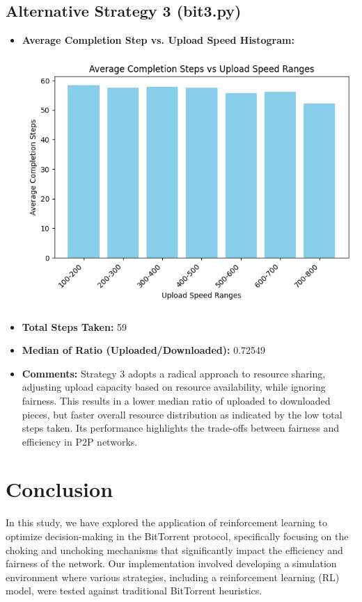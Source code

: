 \documentclass{article}
\begin{document}
\subsection{Alternative Strategy 3 (bit3.py)}
\begin{itemize}
\item \textbf{Average Completion Step vs. Upload Speed Histogram:} 

\includegraphics[width=\linewidth]{graphs/bit3.png}
\item \textbf{Total Steps Taken:} 59
\item \textbf{Median of Ratio (Uploaded/Downloaded):} 0.72549
\item \textbf{Comments:} Strategy 3 adopts a radical approach to resource sharing, adjusting upload capacity based on resource availability, while ignoring fairness. This results in a lower median ratio of uploaded to downloaded pieces, but faster overall resource distribution as indicated by the low total steps taken. Its performance highlights the trade-offs between fairness and efficiency in P2P networks.
\end{itemize}


\section{Conclusion}
In this study, we have explored the application of reinforcement learning to optimize decision-making in the BitTorrent protocol, specifically focusing on the choking and unchoking mechanisms that significantly impact the efficiency and fairness of the network. Our implementation involved developing a simulation environment where various strategies, including a reinforcement learning (RL) model, were tested against traditional BitTorrent heuristics.
\end{document}
